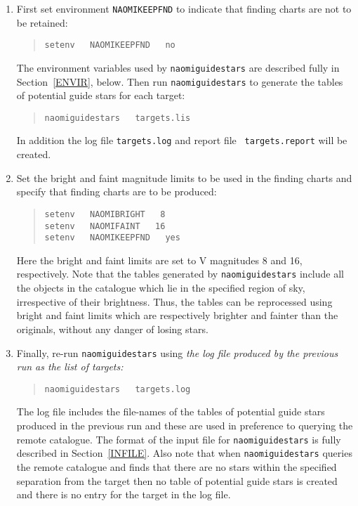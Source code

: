 \documentclass[twoside,11pt]{article}
\renewcommand{\_}{\texttt{\symbol{95}}}
\begin{document}
\begin{enumerate}

  \item First set environment {\tt NAOMI\_KEEPFND} to indicate that
   finding charts are not to be retained:

  \begin{quote}
   {\tt setenv ~ NAOMI\_KEEPFND ~  no}
  \end{quote}

   The environment variables used by {\tt naomiguidestars} are described
   fully in Section~\ref{ENVIR}, below.  Then run {\tt naomiguidestars}
   to generate the tables of potential guide stars for each target:

  \begin{quote}
   {\tt naomiguidestars ~ targets.lis}
  \end{quote}

   In addition the log file {\tt targets.log} and report file {\tt
   targets.report} will be created.

  \item Set the bright and faint magnitude limits to be used in the
   finding charts and specify that finding charts are to be produced:

  \begin{quote}
   {\tt setenv ~ NAOMI\_BRIGHT ~  8 \\
   setenv ~ NAOMI\_FAINT       ~  16 \\
   setenv ~ NAOMI\_KEEPFND ~  yes}
  \end{quote}

   Here the bright and faint limits are set to V magnitudes 8 and 16,
   respectively.  Note that the tables generated by {\tt naomiguidestars}
   include all the objects in the catalogue which lie in the specified
   region of sky, irrespective of their brightness.  Thus, the tables can
   be reprocessed using bright and faint limits which are respectively
   brighter and fainter than the originals, without any danger of losing
   stars.

  \item Finally, re-run {\tt naomiguidestars} using {\it the log file
   produced by the previous run as the list of targets:}

  \begin{quote}
   {\tt naomiguidestars ~ targets.log}
  \end{quote}

   The log file includes the file-names of the tables of potential guide
   stars produced in the previous run and these are used in preference
   to querying the remote catalogue.  The format of the input file for
   {\tt naomiguidestars} is fully described in Section~\ref{INFILE}.
   Also note that when {\tt naomiguidestars} queries the remote catalogue
   and finds that there are no stars within the specified separation
   from the target then no table of potential guide stars is created and
   there is no entry for the target in the log file.

\end{enumerate}
\end{document}

